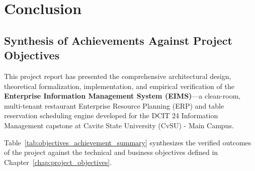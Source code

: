 \chapter{Conclusion}
\label{chap:conclusion}

\section{Synthesis of Achievements Against Project Objectives}
\label{sec:concl_synthesis}
This project report has presented the comprehensive architectural design, theoretical formalization, implementation, and empirical verification of the \textbf{Enterprise Information Management System (EIMS)}---a clean-room, multi-tenant restaurant Enterprise Resource Planning (ERP) and table reservation scheduling engine developed for the DCIT 24 Information Management capstone at Cavite State University (CvSU) - Main Campus.

Table~\ref{tab:objectives_achievement_summary} synthesizes the verified outcomes of the project against the technical and business objectives defined in Chapter~\ref{chap:project_objectives}.

